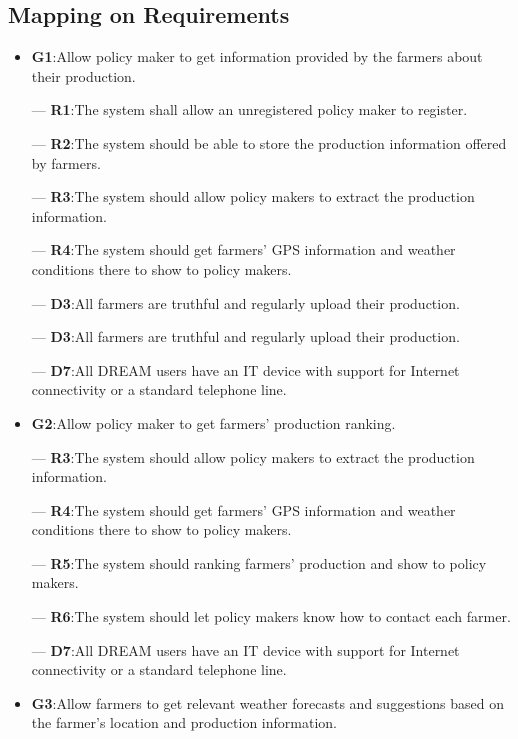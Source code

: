 \documentclass[../../main.tex]{subfiles}
\begin{document}
\subsection{Mapping on Requirements}
\begin{itemize}
		\item \textbf{G1}:Allow policy maker to get information provided by the farmers about their production.
		
    		---\textbf{ R1}:The system shall allow an unregistered policy maker to register.
    		
    		---\textbf{ R2}:The system should be able to store the production information offered by farmers.
    		
    		---\textbf{ R3}:The system should allow policy makers to extract the production information.
    		
    		---\textbf{ R4}:The system should get farmers' GPS information and weather conditions there to show to policy makers.
    		
		    ---\textbf{ D3}:All farmers are truthful and regularly upload their production.
		    
    		---\textbf{ D3}:All farmers are truthful and regularly upload their production.
    		
    		---\textbf{ D7}:All DREAM users have an IT device with support for Internet connectivity or a standard telephone line.
		
		
		\item \textbf{G2}:Allow policy maker to get farmers’ production ranking.
		    
		    ---\textbf{ R3}:The system should allow policy makers to extract the production information.
		    
		    ---\textbf{ R4}:The system should get farmers' GPS information and weather conditions there to show to policy makers.
		    
		    ---\textbf{ R5}:The system should ranking farmers' production and show to policy makers.
		    
		    ---\textbf{ R6}:The system should let policy makers know how to contact each farmer.
		    
    		---\textbf{ D7}:All DREAM users have an IT device with support for Internet connectivity or a standard telephone line.
		
		
		\item \textbf{G3}:Allow farmers to get relevant weather forecasts and suggestions based on the farmer’s location and production information.
		

\end{itemize}
\end{document}
